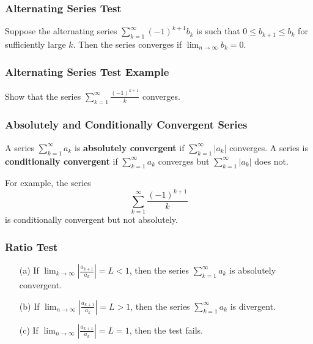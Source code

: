 \documentclass{beamer}
\begin{document}
  \begin{frame}
  \frametitle{Alternating Series Test}
  
  \begin{Theorem} 
Suppose the alternating series $\displaystyle\sum_{k = 1}^\infty (-1)^{k + 1} b_k$ is such that $0 \leq b_{k + 1} \leq b_k$ for sufficiently large $k$. Then the series converges if $\displaystyle\lim_{n\to\infty} b_k = 0$.
  \end{Theorem}
  \end{frame}
   
  \begin{frame}[t]
 \frametitle{Alternating Series Test Example}
 \begin{Example}
 Show that the series $\displaystyle\sum_{k = 1}^\infty \frac{(-1)^{k + 1}}{k}$ converges.
 \end{Example}
 
 \end{frame}
 
 
 \begin{frame}
  \frametitle{Absolutely and Conditionally Convergent Series}
  
  \begin{Definition}
  A series $\displaystyle\sum_{k = 1}^\infty a_k$ is {\bf absolutely convergent} if $\displaystyle\sum_{k = 1}^\infty |a_k|$ converges. A series is {\bf conditionally convergent} if $\displaystyle\sum_{k = 1}^\infty a_k$ converges but $\displaystyle\sum_{k = 1}^\infty |a_k|$ does not.
  \end{Definition}
  For example, the series
  $$
  \sum_{k = 1}^\infty \frac{(-1)^{k + 1}}{k}
  $$
  is conditionally convergent but not absolutely. 
  
 \end{frame}
 
 \begin{frame}
   \frametitle{Ratio Test}
   \begin{Theorem}
   \begin{enumerate}
   \item[(a)] If $\displaystyle\lim_{k\to\infty} \left|\frac{a_{k + 1}}{a_k}\right| = L < 1$, then the series $\displaystyle\sum_{k = 1}^\infty a_k$ is absolutely convergent.
   \item[(b)] If $\displaystyle\lim_{n\to\infty}\left|\frac{a_{k + 1}}{a_k}\right| = L > 1$, then the series $\displaystyle\sum_{k = 1}^\infty a_k$  is divergent.
   \item[(c)] If $\displaystyle\lim_{n\to\infty}\left|\frac{a_{k + 1}}{a_k}\right| = L = 1$, then the test fails.
   \end{enumerate}
   \end{Theorem}
 \end{frame}
 
\end{document}
